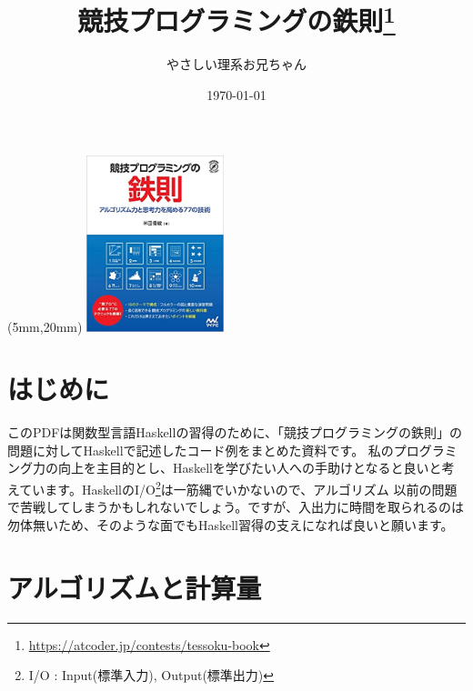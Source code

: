 \documentclass[12pt,a4paper,dvipdfmx,fleqn]{article}%
\title{競技プログラミングの鉄則\thanks{\url{https://atcoder.jp/contests/tessoku-book}}}
\author{やさしい理系お兄ちゃん}
\date{\today}
\theoremstyle{definition}
\theoremstyle{definition}
\theoremstyle{definition}
\begin{document}
\begin{textblock*}{.5\textwidth}(5mm,20mm)
    \includegraphics[width=4cm]{logo.jpg}
\end{textblock*}
\maketitle
\tableofcontents
\clearpage
\setcounter{section}{-1}
\section{はじめに}\label{はじめに}
このPDFは関数型言語Haskellの習得のために、「競技プログラミングの鉄則」の問題に対してHaskellで記述したコード例をまとめた資料です。
私のプログラミング力の向上を主目的とし、Haskellを学びたい人への手助けとなると良いと考えています。HaskellのI/O\footnote{I/O : Input(標準入力), Output(標準出力)}は一筋縄でいかないので、アルゴリズム
以前の問題で苦戦してしまうかもしれないでしょう。ですが、入出力に時間を取られるのは勿体無いため、そのような面でもHaskell習得の支えになれば良いと願います。
\section{アルゴリズムと計算量}\label{アルゴリズムと計算量}
\end{document}
